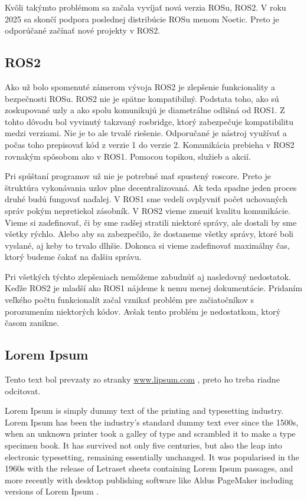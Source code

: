 Kvôli takýmto problémom sa začala vyvíjať nová verzia ROSu, ROS2. V roku 2025 sa skončí podpora poslednej distribúcie ROSu menom Noetic.
Preto je odporúčané začínať nové projekty v ROS2.

\subsection{ROS2}

\noindent Ako už bolo spomenuté zámerom vývoja ROS2 je zlepšenie funkcionality a bezpečnosti ROSu. ROS2 nie je spätne kompatibilný.
Podstata toho, ako sú zoskupované uzly a ako spolu komunikujú je diametrálne odlišná od ROS1. Z tohto dôvodu bol vyvinutý takzvaný rosbridge,
ktorý zabezpečuje kompatibilitu medzi verziami. Nie je to ale trvalé riešenie. Odporučané je nástroj využívať a počas toho prepisovať kód
z verzie 1 do verzie 2. Komunikácia prebieha \newline v ROS2 rovnakým spôsobom ako v ROS1. Pomocou topikou, služieb a akcií.

Pri spúštaní programov už nie je potrebné mať spustený roscore. Preto je štruktúra vykonávania uzlov plne decentralizovaná. Ak teda spadne
jeden proces druhé budú fungovať naďalej. V ROS1 sme vedeli ovplyvniť počet uchovaných správ pokým nepretiekol zásobník. V ROS2 vieme zmeniť
kvalitu komunikácie. Vieme si zadefinovať, či by sme radšej stratili niektoré správy, ale dostali by sme všetky rýchlo. Alebo aby sa zabezpečilo,
že dostaneme všetky správy, ktoré boli vyslané, aj keby to trvalo dlhšie. Dokonca si vieme zadefinovať maximálny čas, ktorý budeme čakať na ďalšiu správu.

Pri všetkých týchto zlepšeniach nemôžeme zabudnúť aj nasledovný nedostatok. Keďže ROS2 je mladší ako ROS1 nájdeme k nemu menej dokumentácie.
Pridaním veľkého počtu funkcionalít začal vznikať problém pre začiatočníkov s porozumením niektorých kódov. Avšak tento problém je nedostatkom,
ktorý časom zanikne.

\subsection{Lorem Ipsum}
Tento text bol prevzaty zo stranky \url{www.lipsum.com} \cite{lipsum}, preto ho treba riadne odcitovat.

Lorem Ipsum is simply dummy text of the printing and typesetting industry. Lorem Ipsum has been the industry's standard dummy text ever since the 1500s, when an unknown printer took a galley of type and scrambled it to make a type specimen book. It has survived not only five centuries, but also the leap into electronic typesetting, remaining essentially unchanged. It was popularised in the 1960s with the release of Letraset sheets containing Lorem Ipsum passages, and more recently with desktop publishing software like Aldus PageMaker including versions of Lorem Ipsum \cite{lipsum}.

